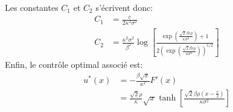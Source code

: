 Les constantes $C_1$ et $C_2$ s'écrivent donc:
\begin{equation}\label{control_2_constants}
    \begin{aligned}
        C_1&=\frac{c}{2 \kappa ^2 \sigma ^2}\\
        C_2&=\frac{\kappa ^2 \sigma ^2 }{\beta ^2}\log \left[\frac{\exp\left({\frac{\sqrt{2} \beta  c \rho }{\kappa  \sigma ^2}}\right)+1}{2 {\left(\exp{\left(\frac{\sqrt{2} \beta  c \rho }{\kappa  \sigma ^2}\right)}\right)}^{1/2}}\right]
    \end{aligned}
\end{equation}
Enfin, le contrôle optimal associé est:
\begin{equation}\label{optimal_control2}
    \begin{aligned}
        u^*(x)&=-\frac{\beta\sqrt{x}}{\kappa^2}F'(x)\\
        &=\frac{\sqrt{2} \rho}{\kappa}  \sqrt{x} \tanh \left[\frac{\sqrt{2} \beta  \rho  \left(x-\frac{c}{2}\right)}{\kappa  \sigma ^2}\right]
    \end{aligned}
\end{equation}
